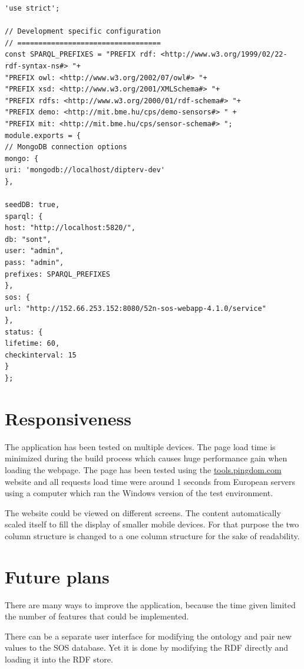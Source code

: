 \begin{lstlisting}[caption={Sample configuration for development environment\label{lst:devconf}}]
'use strict';

// Development specific configuration
// ==================================
const SPARQL_PREFIXES = "PREFIX rdf: <http://www.w3.org/1999/02/22-rdf-syntax-ns#> "+
"PREFIX owl: <http://www.w3.org/2002/07/owl#> "+
"PREFIX xsd: <http://www.w3.org/2001/XMLSchema#> "+
"PREFIX rdfs: <http://www.w3.org/2000/01/rdf-schema#> "+
"PREFIX demo: <http://mit.bme.hu/cps/demo-sensors#> " +
"PREFIX mit: <http://mit.bme.hu/cps/sensor-schema#> ";
module.exports = {
// MongoDB connection options
mongo: {
uri: 'mongodb://localhost/dipterv-dev'
},

seedDB: true,
sparql: {
host: "http://localhost:5820/",
db: "sont",
user: "admin",
pass: "admin",
prefixes: SPARQL_PREFIXES
},
sos: {
url: "http://152.66.253.152:8080/52n-sos-webapp-4.1.0/service"
},
status: {
lifetime: 60,
checkinterval: 15
}
};
\end{lstlisting}

\section{Responsiveness}

The application has been tested on multiple devices. The page load time is minimized during the build process which causes huge performance gain when loading the webpage. The page has been tested using the \url{tools.pingdom.com} website and all requests load time were around 1 seconds from European servers using a computer which ran the Windows version of the test environment. 

The website could be viewed on different screens. The content automatically scaled itself to fill the display of smaller mobile devices. For that purpose the two column structure is changed to a one column structure for the sake of readability.

\section{Future plans}

There are many ways to improve the application, because the time given limited the number of features that could be implemented. 

There can be a separate user interface for modifying the ontology and pair new values to the SOS database. Yet it is done by modifying the RDF directly and loading it into the RDF store. 

